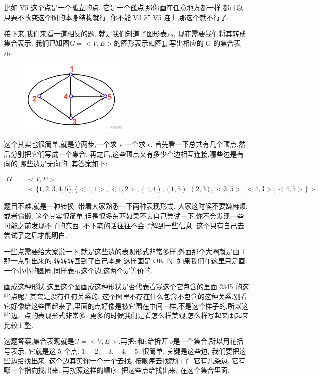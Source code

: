 比如 V5 这个点是一个孤立的点. 它是一个孤点,那你画在任意地方都一样,都可以. 只要不改变这个图的本身结构就行. 你不能 V3 和 V5 连上,那这个就不行了. 

接下来,我们来看一道相反的题, 就是我们知道了图形表示, 现在需要我们将其转成集合表示. 我们已知图$G=<V,E>$的图形表示如图\ref{fig:img25_2}, 写出相应的 G 的集合表示. 

\begin{figure}[ht]
  \centering
  \includegraphics[width=0.5\textwidth]{asset/20231227145043.png}
  \caption{}
  \label{fig:img25_2}
\end{figure}

这个其实也很简单,就是分两步,一个求 v 一个求 e. 首先看一下总共有几个顶点,然后分别把它们写成一个集合. 再之后,这些顶点又有多少个边相互连接,哪些边是有向的,哪些边是无向的. 其答案如下: 

\begin{align*}
  G & = <V, E> \\ & = <\{1, 2, 3, 4, 5\}, \{<1, 1>,<1, 2>,(1, 4),(1, 5),(2, 3),<3, 5>,<4, 3>,<4, 5>\}>
\end{align*}

题目不难,就是一种转换. 带着大家熟悉一下两种表现形式. 大家这时候不要嫌麻烦,或者偷懒. 这个其实很简单,但是很多东西如果不去自己尝试一下,你不会发现一些可能之前发现不了的东西. 不下笔的话往往不会了解到一些信息. 这个只有自己去尝试了之后才能明白. 

一些点需要给大家说一下,就是这些边的表现形式非常多样,外面那个大圈就是由 1 那一点引出来的,转转转回到了自己本身,这样画是 OK 的. 如果我们在这里只是画一个小小的圆圈,同样表示这个边,这两个是等价的. 

画成这种形状,这里这个图画成这种形状是否代表着我这个它包含的里面 2345 的这些点呢? 其实是没有任何关系的. 这个图里不存在什么包含不包含的这种关系,别看它好像给这些围起来了,里面的点好像是被它围在中间一样,不是这个样子的,所以这些边、点的表现形式非常多. 更多的时候我们是看怎么样美观,怎么样写起来画起来比较工整. 

这题答案,集合表现就是$G=<V,E>$,再把$v$和$e$给拆开,$v$是一个集合,所以用花括号表示. 它就是这 5 个点: $1, \quad 2, \quad 3, \quad 4, \quad 5$, 很简单. 关键是这些边, 我们要把这些边给找出来. 这个边其实你一个一个去找, 按顺序去找就行了. 它有几条边, 它有哪一个指向找出来. 再按照这样的顺序, 把这些点给找出来, 在这个集合里面. 

